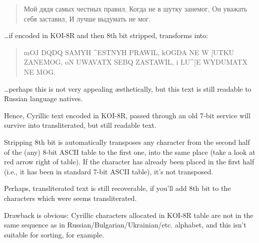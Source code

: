 \begin{framed}
\begin{quotation}
Мой дядя самых честных правил, Когда не в шутку занемог, Он уважать себя заставил, И лучше выдумать не мог.
\end{quotation}
\end{framed}

\dots if encoded in KOI-8R and then 8th bit stripped, transforms into:

\begin{framed}
\begin{quotation}
mOJ DQDQ SAMYH \^{}ESTNYH PRAWIL, kOGDA NE W [UTKU ZANEMOG, oN UWAVATX SEBQ ZASTAWIL, i LU\^{}[E WYDUMATX NE MOG.
\end{quotation}
\end{framed}

\dots perhaps this is not very appealing \ae{}sthetically, but this text is still readable to Russian language natives.

Hence, Cyrillic text encoded in KOI-8R, passed through an old 7-bit service will survive into transliterated, but still
readable text.

Stripping 8th bit is automatically transposes any character from the second half of
the (any) 8-bit \ac{ASCII} table to the first one, into the same place (take a look at red arrow right of table).
If the character has already been placed in the first half (i.e., it has been in standard 7-bit \ac{ASCII} table), it's not transposed.

Perhaps, transliterated text is still recoverable, if you'll add 8th bit to the characters which were seems
transliterated.

Drawback is obvious: Cyrillic characters allocated in KOI-8R table are not in the same sequence as
in Russian/Bulgarian/Ukrainian/etc. alphabet, and this isn't suitable for sorting, for example.

